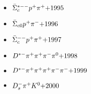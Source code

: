 \begin{multicols}{3}
\begin{itemize}
 \item $ \bar{\Sigma}_{c}^{*--} p^{+} \pi^{+} \hfill{+1995}$
 \item $ \bar{\Sigma}_{c0} p^{+} \pi^{-} \hfill{+1996}$
 \item $ \bar{\Sigma}_{c}^{--} p^{+} \pi^{+} \hfill{+1997}$
 \item $ D^{*-} \pi^{+} \pi^{+} \pi^{-} \pi^{0} \hfill{+1998}$
 \item $ D^{*-} \pi^{+} \pi^{+} \pi^{+} \pi^{-} \pi^{-} \hfill{+1999}$
 \item $ D_{s}^{-} \pi^{+} K^{0} \hfill{+2000}$
 \end{itemize} 
 \end{multicols} 

